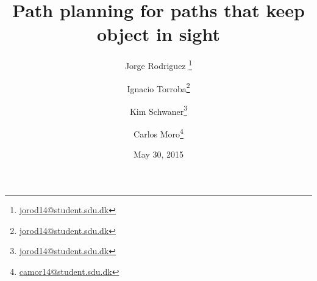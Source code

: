 
\title{Path planning for paths that keep object in sight}
\date{May 30, 2015}
\author{Jorge Rodriguez \thanks{\url{jorod14@student.sdu.dk}}}
\author{Ignacio Torroba\thanks{\url{jorod14@student.sdu.dk}}}
\author{Kim Schwaner\thanks{\url{jorod14@student.sdu.dk}}}
\author{Carlos Moro\thanks{\url{camor14@student.sdu.dk}}}
